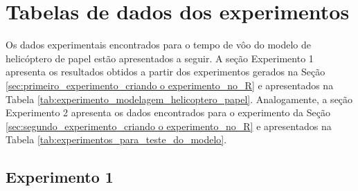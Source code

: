 \chapter{Tabelas de dados dos experimentos}
\label{chap:app_tabelas_de_dados_dos_experimentos}

Os dados experimentais encontrados para o tempo de vôo do modelo de helicóptero de papel estão apresentados a seguir. A seção Experimento 1 apresenta os resultados obtidos a partir dos experimentos gerados na Seção \ref{sec:primeiro_experimento_criando o experimento_no_R} e apresentados na Tabela \ref{tab:experimento_modelagem_helicoptero_papel}. Analogamente, a seção Experimento 2 apresenta os dados encontrados para o experimento da Seção \ref{sec:segundo_experimento_criando o experimento_no_R} e apresentados na Tabela \ref{tab:experimentos_para_teste_do_modelo}.

\section{Experimento 1}
\label{sec:app_experimento_1}

\begin{table}[H]
  \caption{Dados experimentais para modelagem.}
  \label{tab:dados_experimentais_para_modelagem}
\end{table}

